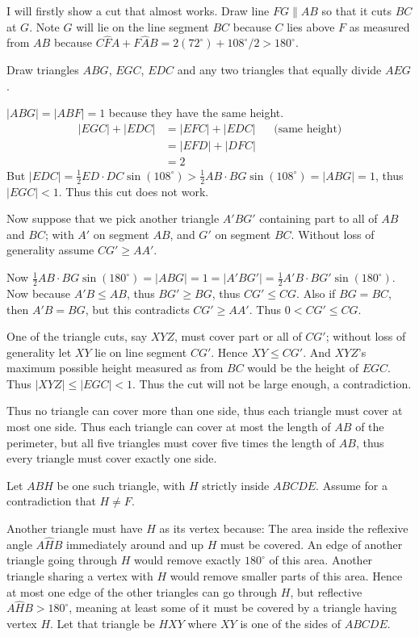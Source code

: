 \documentclass[12pt]{article}
\begin{document}
\begin{enumerate}[topsep=\bigskipamount,itemsep=\bigskipamount,leftmargin=0pt]
I will firstly show a cut that almost works.
Draw line $FG\parallel AB$ so that it cuts $BC$ at $G$.
Note $G$ will lie on the line segment $BC$ because $C$ lies above $F$ as measured from $AB$ because $C\hat{F}A + F\hat{A}B = 2(72^\circ) + 108^\circ/2>180^\circ$.

Draw triangles $ABG$, $EGC$, $EDC$ and any two triangles that equally divide $AEG$.

$|ABG| = |ABF| = 1$ because they have the same height.
\begin{align*}
    |EGC|+|EDC| &= |EFC|+|EDC| && \text{(same height)} \\
    &= |EFD|+|DFC| \\
    &= 2
\end{align*}
But $|EDC| = \frac{1}{2}ED\cdot DC\sin(108^\circ) > \frac{1}{2}AB\cdot BG\sin(108^\circ) = |ABG| = 1$,
thus $|EGC| < 1$.
Thus this cut does not work.

Now suppose that we pick another triangle $A'BG'$
containing part to all of $AB$ and $BC$;
with $A'$ on segment $AB$, 
and $G'$ on segment $BC$.
Without loss of generality assume $CG' \geq AA'$.

Now $\frac{1}{2} AB\cdot BG\sin(180^\circ) = |ABG| = 1 = |A'BG'| = \frac{1}{2} A'B\cdot BG'\sin(180^\circ)$.
Now because $A'B\leq AB$, thus $BG'\geq BG$, thus $CG'\leq CG$.
Also if $BG = BC$, then $A'B = BG$, but this contradicts $CG' \geq AA'$.
Thus $0 < CG'\leq CG$.

One of the triangle cuts, say $XYZ$, must cover part or all of $CG'$; without loss of generality let $XY$ lie on line segment $CG'$.
Hence $XY \leq CG'$.
And $XYZ$'s maximum possible height measured as from $BC$ would be the height of $EGC$.
Thus $|XYZ| \leq |EGC| < 1$.
Thus the cut will not be large enough, a contradiction.

Thus no triangle can cover more than one side, thus each triangle must cover at most one side.
Thus each triangle can cover at most the length of $AB$ of the perimeter, but all five triangles must cover five times the length of $AB$, thus every triangle must cover exactly one side.

Let $ABH$ be one such triangle, with $H$ strictly inside $ABCDE$.
Assume for a contradiction that $H\neq F$.

Another triangle must have $H$ as its vertex because: 
The area inside the reflexive angle $A\hat{H}B$ immediately around and up $H$ must be covered.
An edge of another triangle going through $H$ would remove exactly $180^\circ$
of this area.
Another triangle sharing a vertex with $H$ would remove smaller parts of this area.
Hence at most one edge of the other triangles can go through $H$, but reflective $A\hat{H}B>180^\circ$, meaning at least some of it must be covered
by a triangle having vertex $H$.
Let that triangle be $HXY$ where $XY$ is one of the sides of $ABCDE$.


\end{enumerate}
\end{document}
